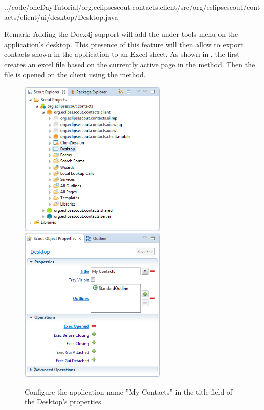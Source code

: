\documentclass[a4paper,10pt,twoside]{book}
\begin{document}

{../code/oneDayTutorial/org.eclipsescout.contacts.client/src/org/eclipsescout/contacts/client/ui/desktop/Desktop.java}

Remark: Adding the Docx4j support will add the  under tools menu on the application's desktop. 
This presence of this feature will then allow to export contacts shown in the application to an Excel sheet. 
As shown in , the  first creates an excel file based on the currently active page in the  method. 
Then the file is opened on the client using the  method.

\begin{figure}
\includegraphics[width=7cm]{desktop_explorer.png} \hspace{5mm}
\includegraphics[width=7cm]{desktop_properties.png}
\caption{Configure the application name ''My Contacts'' in the title field of the Desktop's properties. }
\end{figure}
\end{document}
